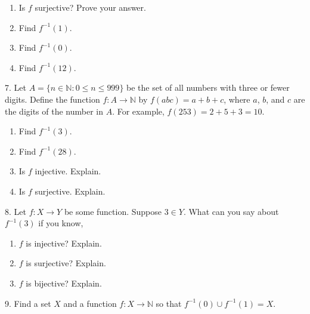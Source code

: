 \documentclass[10pt,]{memoir}
\theoremstyle{plain}
\theoremstyle{definition}
\theoremstyle{definition}
\theoremstyle{definition}
\numberwithin{equation}{chapter}
\def\N{\mathbb N}
\def\inv{^{-1}}
\def\st{:}
\begin{document}
\begin{exerciselist}
\begin{enumerate}[label=(\alph*)]
\item\hypertarget{li-321}{}
                Is \(f\) surjective? Prove your answer.
\item\hypertarget{li-322}{}
                Find \(f\inv(1)\).
\item\hypertarget{li-323}{}
                Find \(f\inv(0)\).
\item\hypertarget{li-324}{}
                Find \(f\inv(12)\).
\end{enumerate}
\par\smallskip
\item[7.]\hypertarget{exercise-33}{}
            Let \(A = \{n \in \N \st 0 \le n \le 999\}\) be the set of all numbers with three or fewer digits. Define the function \(f:A \to \N\) by \(f(abc) = a+b+c\), where \(a\), \(b\), and \(c\) are the digits of the number in \(A\). For example, \(f(253) = 2 + 5 + 3 =  10\).
\leavevmode%
\begin{enumerate}[label=(\alph*)]
\item\hypertarget{li-330}{}
                Find \(f\inv(3)\).
\item\hypertarget{li-331}{}
                Find \(f\inv(28)\).
\item\hypertarget{li-332}{}
                Is \(f\) injective. Explain.
\item\hypertarget{li-333}{}
                Is \(f\) surjective. Explain.
\end{enumerate}
\par\smallskip
\item[8.]\hypertarget{exercise-34}{}
            Let \(f:X \to Y\) be some function. Suppose \(3 \in Y\). What can you say about \(f\inv(3)\) if you know,
\leavevmode%
\begin{enumerate}[label=(\alph*)]
\item\hypertarget{li-338}{}\(f\) is injective? Explain.\item\hypertarget{li-339}{}\(f\) is surjective? Explain.\item\hypertarget{li-340}{}\(f\) is bijective? Explain.\end{enumerate}
\par\smallskip
\item[9.]\hypertarget{exercise-35}{}
            Find a set \(X\) and a function \(f:X \to \N\) so that \(f\inv(0) \cup f\inv(1) = X\).
\par\smallskip

\end{exerciselist}
\end{document}
